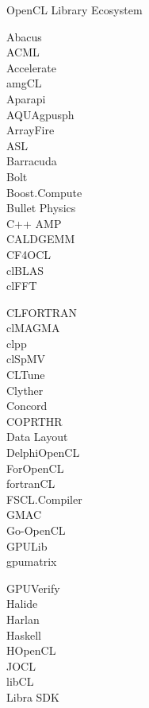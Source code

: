 


\begin{frame}{OpenCL Library Ecosystem}

 \begin{minipage}{0.19\textwidth}
Abacus\\
ACML\\
Accelerate\\
amgCL\\
Aparapi\\
AQUAgpusph\\
ArrayFire\\
ASL\\
Barracuda\\
Bolt\\
Boost.Compute\\
Bullet Physics\\
C++ AMP\\
CALDGEMM\\
CF4OCL\\
clBLAS\\
clFFT\\
 \end{minipage}
 \begin{minipage}{0.19\textwidth}
CLFORTRAN\\
clMAGMA\\
clpp\\
clSpMV\\
CLTune\\
Clyther\\
Concord\\
COPRTHR\\
Data Layout\\
DelphiOpenCL\\
ForOpenCL\\
fortranCL\\
FSCL.Compiler\\
GMAC\\
Go-OpenCL\\
GPULib\\
gpumatrix\\
 \end{minipage}
  \begin{minipage}{0.2\textwidth}
GPUVerify\\
Halide\\
Harlan\\
Haskell\\
HOpenCL\\
JOCL\\
libCL\\
Libra SDK\\

\end{minipage}
\end{frame}
